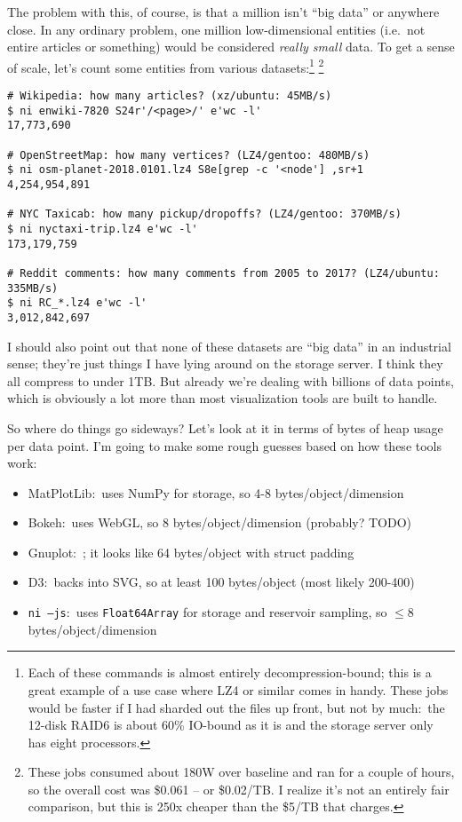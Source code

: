 The problem with this, of course, is that a million isn't ``big data'' or
anywhere close. In any ordinary problem, one million low-dimensional entities
(i.e.~not entire articles or something) would be considered {\it really small}
data. To get a sense of scale, let's count some entities from various
datasets:\footnote{Each of these commands is almost entirely
decompression-bound; this is a great example of a use case where LZ4 or similar
comes in handy. These jobs would be faster if I had sharded out the files up
front, but not by much:~the 12-disk RAID6 is about 60\% IO-bound as it is and
the storage server only has eight processors.} \footnote{These jobs consumed
about 180W over baseline and ran for a couple of hours, so the overall cost was
\$0.061 -- or \$0.02/TB. I realize it's not an entirely fair comparison, but
this is 250x cheaper than the \$5/TB that
 charges.}

\begin{verbatim}
# Wikipedia: how many articles? (xz/ubuntu: 45MB/s)
$ ni enwiki-7820 S24r'/<page>/' e'wc -l'
17,773,690

# OpenStreetMap: how many vertices? (LZ4/gentoo: 480MB/s)
$ ni osm-planet-2018.0101.lz4 S8e[grep -c '<node'] ,sr+1
4,254,954,891

# NYC Taxicab: how many pickup/dropoffs? (LZ4/gentoo: 370MB/s)
$ ni nyctaxi-trip.lz4 e'wc -l'
173,179,759

# Reddit comments: how many comments from 2005 to 2017? (LZ4/ubuntu: 335MB/s)
$ ni RC_*.lz4 e'wc -l'
3,012,842,697 \end{verbatim}

I should also point out that none of these datasets are ``big data'' in an
industrial sense; they're just things I have lying around on the storage server.
I think they all compress to under 1TB. But already we're dealing with billions
of data points, which is obviously a lot more than most visualization tools are
built to handle.

So where do things go sideways? Let's look at it in terms of bytes of heap usage
per data point. I'm going to make some rough guesses based on how these tools
work:

\begin{itemize}
  \item MatPlotLib:~uses NumPy for storage, so 4-8 bytes/object/dimension
  \item Bokeh:~uses WebGL, so 8 bytes/object/dimension (probably? TODO)
  \item Gnuplot:~; it looks like 64 bytes/object with struct padding
  \item D3:~backs into SVG, so at least 100 bytes/object (most likely 200-400)
  \item {\tt ni --js}:~uses {\tt Float64Array} for storage and reservoir
        sampling, so $\le$8 bytes/object/dimension
\end{itemize}

